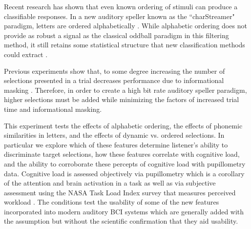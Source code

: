 \documentclass[10pt]{article}
\begin{document}
Recent research has shown that even known ordering of stimuli can
produce a classifiable responses.  In a new auditory speller known
as the “charStreamer" paradigm, letters are ordered
alphabetically \cite{Hohne2014}.  While alphabetic ordering does not
provide as robust a signal as the classical oddball paradigm in this
filtering method, it still retains some statistical structure that
new classification methods could extract \cite{Hohne2014}.  

Previous experiments show that, to some degree increasing the number
of selections presented in a trial decreases performance due to
informational masking \cite{Maddox2012a}. Therefore, in order to
create a high bit rate auditory speller paradigm, higher selections
must be added while minimizing the factors of increased trial time
and informational masking. 



This experiment tests the effects of alphabetic ordering, the
effects of phonemic similarities in letters, and the effects
of dynamic vs. ordered selections.  In particular we explore
which of these features determine listener's ability to
discriminate target selections, how these features correlate
with cognitive load, and the ability to corroborate these
percepts of cognitive load with pupillometry data.  Cognitive load is
assessed objectively via pupillometry which is a corollary of
the attention and brain activation in a task as well as via
subjective assessment using the NASA Task Load Index survey
that measures perceived workload \cite{Zickler2013a}.  The
conditions test the usability of some of the new features
incorporated into modern auditory BCI systems which are
generally added with the assumption but without the scientific
confirmation that they aid usability.    


\end{document}
